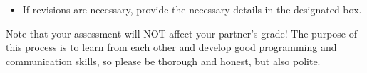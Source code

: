 \documentclass[twocolumn,hidelinks]{article}
\begin{document}
\begin{description}
\begin{itemize}
A template for the feedback is provided on HuskyCT.

\item
  If revisions are necessary, provide the necessary details in the
designated box.
\end{itemize}

Note that your assessment will NOT affect your partner's grade! The
purpose of this process is to learn from each other and develop good
programming and communication skills, so please be thorough and
honest, but also polite.


\end{description}
\end{document}
